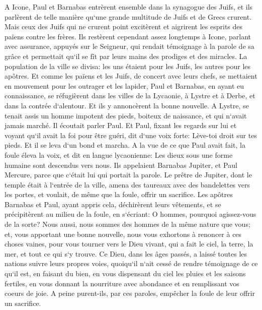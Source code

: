 \verse A Icone, Paul et Barnabas entrèrent ensemble dans la synagogue des Juifs, et ils parlèrent de telle manière qu`une grande multitude de Juifs et de Grecs crurent. 
\verse Mais ceux des Juifs qui ne crurent point excitèrent et aigrirent les esprits des païens contre les frères. 
\verse Ils restèrent cependant assez longtemps à Icone, parlant avec assurance, appuyés sur le Seigneur, qui rendait témoignage à la parole de sa grâce et permettait qu`il se fît par leurs mains des prodiges et des miracles. 
\verse La population de la ville se divisa: les uns étaient pour les Juifs, les autres pour les apôtres. 
\verse Et comme les païens et les Juifs, de concert avec leurs chefs, se mettaient en mouvement pour les outrager et les lapider, 
\verse Paul et Barnabas, en ayant eu connaissance, se réfugièrent dans les villes de la Lycaonie, à Lystre et à Derbe, et dans la contrée d`alentour. 
\verse Et ils y annoncèrent la bonne nouvelle. 
\verse A Lystre, se tenait assis un homme impotent des pieds, boiteux de naissance, et qui n`avait jamais marché. 
\verse Il écoutait parler Paul. Et Paul, fixant les regards sur lui et voyant qu`il avait la foi pour être guéri, 
\verse dit d`une voix forte: Lève-toi droit sur tes pieds. Et il se leva d`un bond et marcha. 
\verse A la vue de ce que Paul avait fait, la foule éleva la voix, et dit en langue lycaonienne: Les dieux sous une forme humaine sont descendus vers nous. 
\verse Ils appelaient Barnabas Jupiter, et Paul Mercure, parce que c`était lui qui portait la parole. 
\verse Le prêtre de Jupiter, dont le temple était à l`entrée de la ville, amena des taureaux avec des bandelettes vers les portes, et voulait, de même que la foule, offrir un sacrifice. 
\verse Les apôtres Barnabas et Paul, ayant appris cela, déchirèrent leurs vêtements, et se précipitèrent au milieu de la foule, 
\verse en s`écriant: O hommes, pourquoi agissez-vous de la sorte? Nous aussi, nous sommes des hommes de la même nature que vous; et, vous apportant une bonne nouvelle, nous vous exhortons à renoncer à ces choses vaines, pour vous tourner vers le Dieu vivant, qui a fait le ciel, la terre, la mer, et tout ce qui s`y trouve. 
\verse Ce Dieu, dans les âges passés, a laissé toutes les nations suivre leurs propres voies, 
\verse quoiqu`il n`ait cessé de rendre témoignage de ce qu`il est, en faisant du bien, en vous dispensant du ciel les pluies et les saisons fertiles, en vous donnant la nourriture avec abondance et en remplissant vos coeurs de joie. 
\verse A peine purent-ils, par ces paroles, empêcher la foule de leur offrir un sacrifice. 
